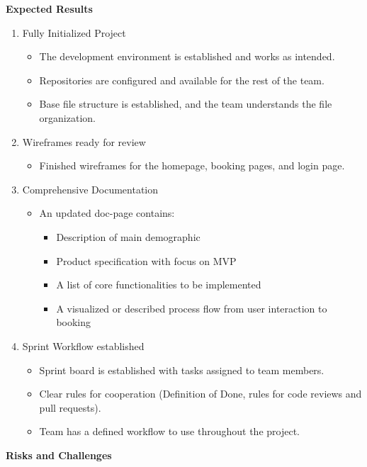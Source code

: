 \documentclass{article}
\begin{document}
\textbf{Expected Results} 

\begin{enumerate}
    \item Fully Initialized Project
    \begin{itemize}
        \item The development environment is established and works as intended.
        \item Repositories are configured and available for the rest of the team.
        \item Base file structure is established, and the team understands the file organization.
    \end{itemize}
    \item Wireframes ready for review
    \begin{itemize}
        \item Finished wireframes for the homepage, booking pages, and login page.
    \end{itemize}
    \item Comprehensive Documentation
    \begin{itemize}
        \item An updated doc-page contains: 
        \begin{itemize}
            \item Description of main demographic
            \item Product specification with focus on MVP
            \item A list of core functionalities to be implemented
            \item A visualized or described process flow from user interaction to booking
        \end{itemize}
    \end{itemize}
    \item Sprint Workflow established
    \begin{itemize}
        \item Sprint board is established with tasks assigned to team members.
        \item Clear rules for cooperation (Definition of Done, rules for code reviews and pull requests).
        \item Team has a defined workflow to use throughout the project.
    \end{itemize}
\end{enumerate}

\textbf{Risks and Challenges} 
\end{document}
